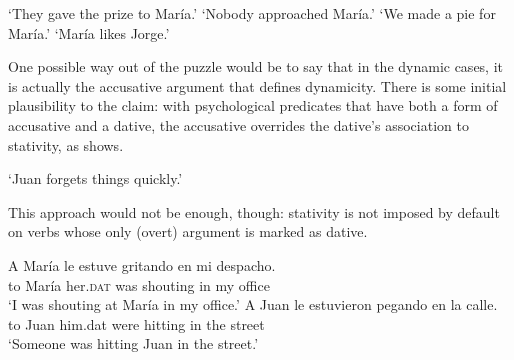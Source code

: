 \documentclass[output=paper,colorlinks,citecolor=brown,nonflat]{./langscibook}
\begin{document}
\ea%
    \label{ex:fabregas:10}
    \glt `They gave the prize to María.'
    \glt `Nobody approached María.'
    \glt `We made a pie for María.'
    \glt `María likes Jorge.'
    \z
\z

One possible way out of the puzzle would be to say that in the dynamic cases, it is actually the accusative argument that defines dynamicity. There is some initial plausibility to the claim: with psychological predicates that have both a form of accusative and a dative, the accusative overrides the dative's association to stativity, as  shows. 

    \glt `Juan forgets things quickly.'
    \z

This approach would not be enough, though: stativity is not imposed by default on verbs whose only (overt) argument \citep{Pineda2016, Pineda2019} is marked as dative.

\ea%
    \label{ex:fabregas:12}
    \ea\label{ex:fabregas:12a}
    \gll    A María le       estuve   gritando en mi despacho.\\
            {to} {María} {her.}\textsc{dat}   {was}      {shouting} {in} {my} {office}\\
    \glt `I was shouting at María in my office.'
    \ex\label{ex:fabregas:12b}
    \gll    A Juan le       estuvieron   pegando en la calle.\\
            {to} {Juan} {him.dat}   {were}          {hitting}    {in} {the} {street}\\
    \glt `Someone was hitting Juan in the street.'
    \z
\z
\end{document}
